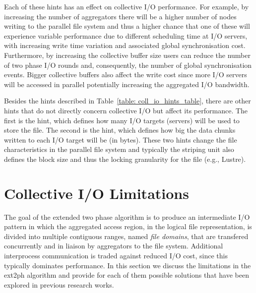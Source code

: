 Each of these hints has an effect on collective I/O performance. For example, by increasing the number of aggregators there will be a higher number of nodes writing to the parallel file 
system and thus a higher chance that one of these will experience variable performance due to different scheduling time at I/O servers, with increasing write time variation and associated 
global synchronisation cost. Furthermore, by increasing the collective buffer size users can reduce the number of two phase I/O rounds and, consequently, the number of global synchronisation 
events. Bigger collective buffers also affect the write cost since more I/O servers will be accessed in parallel potentially increasing the aggregated I/O bandwidth.

Besides the hints described in Table~\ref{table: coll_io_hints_table}, there are other hints that do not directly concern collective I/O but affect its performance. The first is the 
 hint, which defines how many I/O targets (servers) will be used to store the file. The second is the  hint, which defines how big the data chunks 
written to each I/O target will be (in bytes). These two hints change the file characteristics in the parallel file system and typically the striping unit also defines the block size and thus the locking 
granularity for the file (e.g., Lustre).

\section{Collective I/O Limitations} \label{sec: coll_io_limit}
The goal of the extended two phase algorithm is to produce an intermediate I/O pattern in which the aggregated access region, in the logical file representation, is divided into multiple contiguous ranges, 
named \textit{file domains}, that are transfered concurrently and in liaison by aggregators to the file system. Additional interprocess communication is traded against reduced I/O cost, since this typically 
dominates performance. In this section we discuss the limitations in the ext2ph algorithm and provide for each of them possible solutions that have been explored in previous research works.

